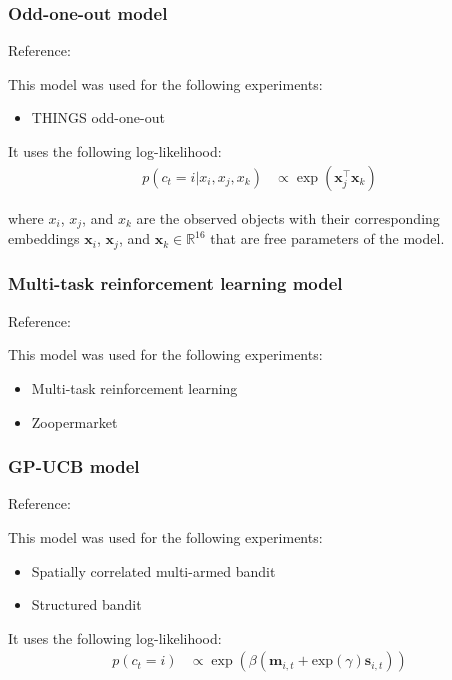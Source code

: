 \documentclass[pdflatex,sn-nature]{sn-jnl}%
\theoremstyle{thmstyleone}%
\theoremstyle{thmstyletwo}%
\theoremstyle{thmstylethree}%
\begin{document}
\subsubsection*{Odd-one-out model}

Reference: \cite{hebart2020revealing}


\noindent This model was used for the following experiments:
\begin{itemize}
    \item THINGS odd-one-out
\end{itemize}

\noindent It uses the following log-likelihood:
\begin{align*}
    p(c_t = i | x_i, x_j, x_k) &\propto \exp\left(\mathbf{x}_j^{\top} \mathbf{x}_k\right) 
\end{align*}

\noindent where $x_i$, $x_j$, and $x_k$ are the observed objects with their  corresponding embeddings $\mathbf{x}_i$, $\mathbf{x}_j$, and $\mathbf{x}_k \in \mathbb{R}^{16}$ that are free parameters of the model.


\subsubsection*{Multi-task reinforcement learning model}

Reference: \cite{tomov2021multi} 

\noindent This model was used for the following experiments:
\begin{itemize}
    \item Multi-task reinforcement learning
    \item Zoopermarket
\end{itemize}

\subsubsection*{GP-UCB model}

Reference: \cite{wu2018generalization} 

\noindent This model was used for the following experiments:
\begin{itemize}
    \item Spatially correlated multi-armed bandit
    \item Structured bandit
\end{itemize}

\noindent It uses the following log-likelihood:
\begin{align*}
    p(c_t = i) &\propto \exp\left(\beta \left( \mathbf{m}_{i,t} + \text{exp} \left( \gamma \right) \mathbf{s}_{i,t} \right) \right)
\end{align*}
\end{document}
